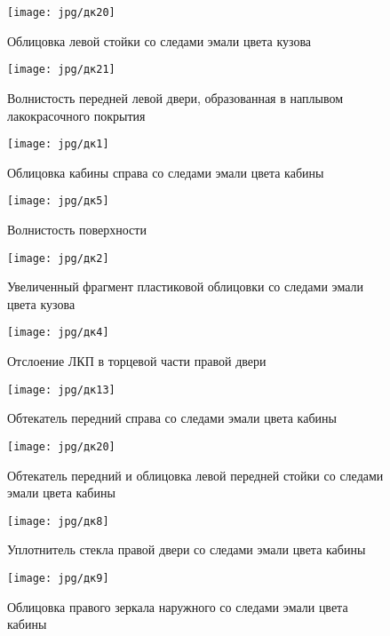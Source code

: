 {    
           
    \begin{figure}[H]\centering
   	\parbox[t]{0.49\textwidth}
   	{\centering
   		\texttt{[image: jpg/дк20]}
   		\caption{\footnotesize {Облицовка левой стойки со следами эмали цвета кузова}}
   		\label{облицовкастойки}}
   	\hfil \hfil
   	\parbox[t]{0.49\textwidth}
   	{\centering
   		\texttt{[image: jpg/дк21]}
   		\caption{\footnotesize {Волнистость передней левой двери, образованная в наплывом лакокрасочного покрытия}}
   		\label{наплывслева}}
   \end{figure}

    \begin{figure}[H]\centering
   	\parbox[t]{0.49\textwidth}
   	{\centering
   		\texttt{[image: jpg/дк1]}
   		\caption{\footnotesize {Облицовка кабины справа со следами эмали цвета кабины}}
   		\label{облицовкаправо}}
   	\hfil \hfil
   	\parbox[t]{0.49\textwidth}
   	{\centering
   		\texttt{[image: jpg/дк5]}
   		\caption{\footnotesize {Волнистость поверхности}}
   		\label{волнистостьсправа}}
   \end{figure}

 \begin{figure}[H]\centering
	\parbox[t]{0.49\textwidth}
	{\centering
		\texttt{[image: jpg/дк2]}
		\caption{\footnotesize {Увеличенный фрагмент пластиковой облицовки со следами эмали цвета кузова}}
		\label{облицовкаэмаль}}
	\hfil \hfil
	\parbox[t]{0.49\textwidth}
	{\centering
		\texttt{[image: jpg/дк4]}
		\caption{\footnotesize {Отслоение ЛКП в торцевой части правой двери}}
		\label{отслоениелкп}}
\end{figure}
   
    \begin{figure}[H]\centering
   	\parbox[t]{0.49\textwidth}
   	{\centering
   		\texttt{[image: jpg/дк13]}
   		\caption{\footnotesize {Обтекатель передний справа со следами эмали цвета кабины}}
   		\label{обтекательп}}
   	\hfil \hfil
   	\parbox[t]{0.49\textwidth}
   	{\centering
   		\texttt{[image: jpg/дк20]}
   		\caption{\footnotesize {Обтекатель передний и облицовка левой передней стойки со следами эмали цвета кабины}}
   		\label{обтекательл}}
   \end{figure}
   
   
    \begin{figure}[H]\centering
   	\parbox[t]{0.49\textwidth}
   	{\centering
   		\texttt{[image: jpg/дк8]}
   		\caption{\footnotesize {Уплотнитель стекла правой двери со следами эмали цвета кабины}}
   		\label{уплотнительп}}
   	\hfil \hfil
   	\parbox[t]{0.49\textwidth}
   	{\centering
   		\texttt{[image: jpg/дк9]}
   		\caption{\footnotesize {Облицовка правого зеркала наружного со следами эмали цвета кабины}}
   		\label{облицовкаправогозеркала}}
   \end{figure}


}
